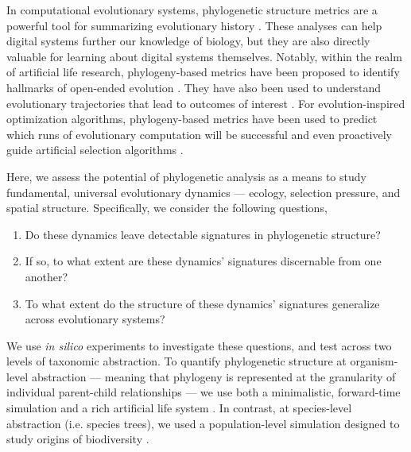 In computational evolutionary systems, phylogenetic structure metrics are a powerful tool for summarizing evolutionary history \citep{dolson2020interpreting}.
These analyses can help digital systems further our knowledge of biology, but they are also directly valuable for learning about digital systems themselves.
Notably, within the realm of artificial life research, phylogeny-based metrics have been proposed to identify hallmarks of open-ended evolution \citep{dolson2019modes}.
They have also been used to understand evolutionary trajectories that lead to outcomes of interest \citep{lenskiEvolutionaryOriginComplex2003,lalejiniEvolutionaryOriginsPhenotypic2016,johnsonEndosymbiosisBustInfluence2022a}.
For evolution-inspired optimization algorithms, phylogeny-based metrics have been used to predict which runs of evolutionary computation will be successful \citep{hernandezWhatCanPhylogenetic2022a,shahbandeganUntanglingPhylogeneticDiversity2022a,ferguson2023potentiating} and even proactively guide artificial selection algorithms \citep{lalejini2024phylogeny,burke2003increased}.

Here, we assess the potential of phylogenetic analysis as a means to study fundamental, universal evolutionary dynamics --- ecology, selection pressure, and spatial structure.
Specifically, we consider the following questions,
\begin{enumerate}
  \item Do these dynamics leave detectable signatures in phylogenetic structure?
  \item If so, to what extent are these dynamics' signatures discernable from one another?
  \item To what extent do the structure of these dynamics' signatures generalize across evolutionary systems?
\end{enumerate}

We use \textit{in silico} experiments to investigate these questions, and test across two levels of taxonomic abstraction.
To quantify phylogenetic structure at organism-level abstraction --- meaning that phylogeny is represented at the granularity of individual parent-child relationships --- we use both a minimalistic, forward-time simulation and a rich artificial life system \citep{ofria2004avida}.
In contrast, at species-level abstraction (i.e. species trees), we used a population-level simulation designed to study origins of biodiversity \citep{hagen2021gen3sis}.

